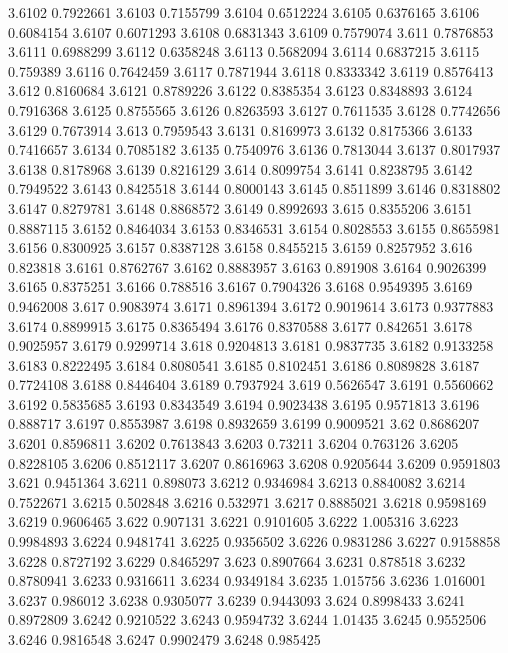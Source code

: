 3.6102  0.7922661
3.6103  0.7155799
3.6104  0.6512224
3.6105  0.6376165
3.6106  0.6084154
3.6107  0.6071293
3.6108  0.6831343
3.6109  0.7579074
3.611  0.7876853
3.6111  0.6988299
3.6112  0.6358248
3.6113  0.5682094
3.6114  0.6837215
3.6115  0.759389
3.6116  0.7642459
3.6117  0.7871944
3.6118  0.8333342
3.6119  0.8576413
3.612  0.8160684
3.6121  0.8789226
3.6122  0.8385354
3.6123  0.8348893
3.6124  0.7916368
3.6125  0.8755565
3.6126  0.8263593
3.6127  0.7611535
3.6128  0.7742656
3.6129  0.7673914
3.613  0.7959543
3.6131  0.8169973
3.6132  0.8175366
3.6133  0.7416657
3.6134  0.7085182
3.6135  0.7540976
3.6136  0.7813044
3.6137  0.8017937
3.6138  0.8178968
3.6139  0.8216129
3.614  0.8099754
3.6141  0.8238795
3.6142  0.7949522
3.6143  0.8425518
3.6144  0.8000143
3.6145  0.8511899
3.6146  0.8318802
3.6147  0.8279781
3.6148  0.8868572
3.6149  0.8992693
3.615  0.8355206
3.6151  0.8887115
3.6152  0.8464034
3.6153  0.8346531
3.6154  0.8028553
3.6155  0.8655981
3.6156  0.8300925
3.6157  0.8387128
3.6158  0.8455215
3.6159  0.8257952
3.616  0.823818
3.6161  0.8762767
3.6162  0.8883957
3.6163  0.891908
3.6164  0.9026399
3.6165  0.8375251
3.6166  0.788516
3.6167  0.7904326
3.6168  0.9549395
3.6169  0.9462008
3.617  0.9083974
3.6171  0.8961394
3.6172  0.9019614
3.6173  0.9377883
3.6174  0.8899915
3.6175  0.8365494
3.6176  0.8370588
3.6177  0.842651
3.6178  0.9025957
3.6179  0.9299714
3.618  0.9204813
3.6181  0.9837735
3.6182  0.9133258
3.6183  0.8222495
3.6184  0.8080541
3.6185  0.8102451
3.6186  0.8089828
3.6187  0.7724108
3.6188  0.8446404
3.6189  0.7937924
3.619  0.5626547
3.6191  0.5560662
3.6192  0.5835685
3.6193  0.8343549
3.6194  0.9023438
3.6195  0.9571813
3.6196  0.888717
3.6197  0.8553987
3.6198  0.8932659
3.6199  0.9009521
3.62  0.8686207
3.6201  0.8596811
3.6202  0.7613843
3.6203  0.73211
3.6204  0.763126
3.6205  0.8228105
3.6206  0.8512117
3.6207  0.8616963
3.6208  0.9205644
3.6209  0.9591803
3.621  0.9451364
3.6211  0.898073
3.6212  0.9346984
3.6213  0.8840082
3.6214  0.7522671
3.6215  0.502848
3.6216  0.532971
3.6217  0.8885021
3.6218  0.9598169
3.6219  0.9606465
3.622  0.907131
3.6221  0.9101605
3.6222  1.005316
3.6223  0.9984893
3.6224  0.9481741
3.6225  0.9356502
3.6226  0.9831286
3.6227  0.9158858
3.6228  0.8727192
3.6229  0.8465297
3.623  0.8907664
3.6231  0.878518
3.6232  0.8780941
3.6233  0.9316611
3.6234  0.9349184
3.6235  1.015756
3.6236  1.016001
3.6237  0.986012
3.6238  0.9305077
3.6239  0.9443093
3.624  0.8998433
3.6241  0.8972809
3.6242  0.9210522
3.6243  0.9594732
3.6244  1.01435
3.6245  0.9552506
3.6246  0.9816548
3.6247  0.9902479
3.6248  0.985425
